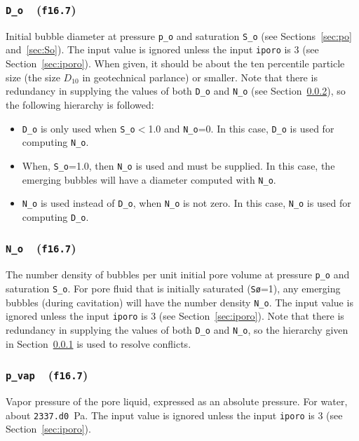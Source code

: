 \documentclass[letterpaper,11pt]{article}
\newcommand{\Var}[2]{\texttt{#1}\ \  (\texttt{#2})}
\begin{document}
\subsubsection[\texttt{D\_o}]{\Var{D\_o}{f16.7}}\label{sec:Do}
Initial bubble diameter at pressure \texttt{p\_o}
and saturation \texttt{S\_o}
(see Sections~\ref{sec:po} and~\ref{sec:So}).
The input value is ignored unless the input
\texttt{iporo} is 3 (see Section~\ref{sec:iporo}).
When given, it should be about the ten percentile
particle size (the size $D_{10}$ in geotechnical parlance)
or smaller.
Note that there is redundancy in supplying the
values of both \texttt{D\_o} and \texttt{N\_o}
(see Section~\ref{sec:No}),
so the following hierarchy is followed:
\begin{itemize}
  \item
  \texttt{D\_o} is only used when \texttt{S\_o}$<$1.0
  and \texttt{N\_o}=0.
  In this case, \texttt{D\_o} is used for computing
  \texttt{N\_o}.
  \item
  When, \texttt{S\_o}=1.0, then \texttt{N\_o} is used and must
  be supplied.
  In this case, the emerging bubbles will have a diameter
  computed with \texttt{N\_o}.
  \item
  \texttt{N\_o} is used instead of \texttt{D\_o},
  when \texttt{N\_o} is not zero.
  In this case, \texttt{N\_o} is used for computing
  \texttt{D\_o}.
\end{itemize}
%
\subsubsection[\texttt{N\_o}]{\Var{N\_o}{f16.7}}\label{sec:No}
The number density of bubbles per unit initial pore volume
at pressure \texttt{p\_o}
and saturation \texttt{S\_o}.
For pore fluid that is initially saturated (\texttt{S\o}=1),
any emerging bubbles (during cavitation) will have the
number density \texttt{N\_o}.
The input value is ignored unless the input
\texttt{iporo} is 3 (see Section~\ref{sec:iporo}).
Note that there is redundancy in supplying the
values of both \texttt{D\_o} and \texttt{N\_o},
so the hierarchy given in Section~\ref{sec:Do}
is used to resolve conflicts.
%
\subsubsection[\texttt{p\_vap}]{\Var{p\_vap}{f16.7}}\label{sec:pvap}
Vapor pressure of the pore liquid, expressed as an absolute pressure.
For water, about \texttt{2337.d0}~Pa.
The input value is ignored unless the input
\texttt{iporo} is 3 (see Section~\ref{sec:iporo}).
%
\end{document}
